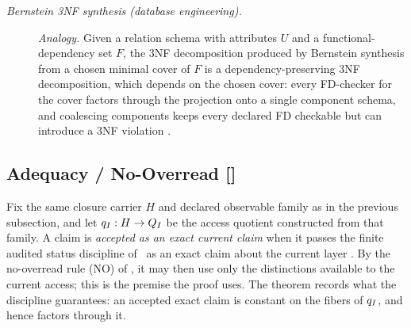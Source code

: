 \begin{description}
\item[\emph{Bernstein 3{NF} synthesis (database engineering).}] \textit{Analogy.}
Given a relation schema with attributes \(U\) and a
functional-dependency set \(F\), the 3NF decomposition produced by Bernstein
synthesis from a chosen minimal cover of \(F\) is a
dependency-preserving 3NF decomposition, which depends on the chosen
cover: every FD-checker for the cover factors through the projection
onto a single component schema, and coalescing components keeps
every declared FD checkable but can introduce a 3NF violation
\citep{Bernstein1976Synthesizing3NF}.

\end{description}
\endgroup


\subsection{Adequacy / No-Overread [\texorpdfstring{}{F11}]}\label{sec:access:adequacy}

Fix the same closure carrier \(H\) and declared observable family as
in the previous subsection, and let \(q_I:H\to Q_I\) be the
access quotient constructed from that family.  A claim is \emph{accepted as an exact current claim} when it passes
the finite audited status discipline of \FoundIII\ as an exact claim
about the current layer \citep{Tsiokos2026FoundationsIII}.  By the
no-overread rule (NO) of , it may then use only the
distinctions available to the current access; this is the premise the
proof uses.  The theorem records what the discipline guarantees: an
accepted exact claim is constant on the fibers of \(q_I\), and
hence factors through it.

